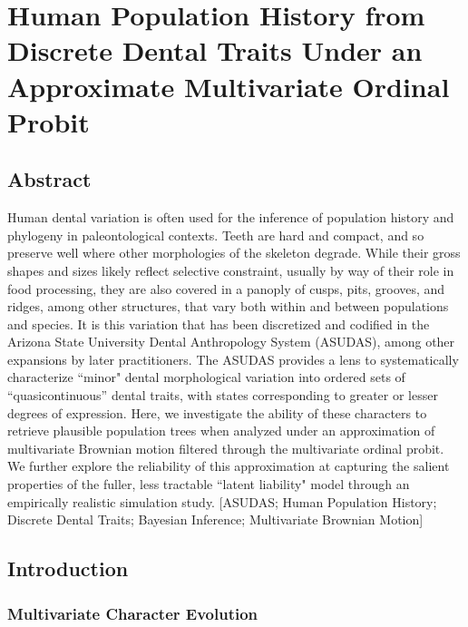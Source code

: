 \chapter[Human Population History from Discrete Dental Traits]{Human Population History from Discrete Dental Traits Under an \\Approximate Multivariate Ordinal Probit}

\label{chpt:Chapter4}


\clearpage

\section{Abstract}
 
Human dental variation is often used for the inference of population history and phylogeny in paleontological contexts. Teeth are hard and compact, and so preserve well where other morphologies of the skeleton degrade. While their gross shapes and sizes likely reflect selective constraint, usually by way of their role in food processing, they are also covered in a panoply of cusps, pits, grooves, and ridges, among other structures, that vary both within and between populations and species. It is this variation that has been discretized and codified in the Arizona State University Dental Anthropology System (ASUDAS), among other expansions by later practitioners. The ASUDAS provides a lens to systematically characterize ``minor" dental morphological variation into ordered sets of ``quasicontinuous'' dental traits, with states corresponding to greater or lesser degrees of expression. Here, we investigate the ability of these characters to retrieve plausible population trees when analyzed under an approximation of multivariate Brownian motion filtered through the multivariate ordinal probit. We further explore the reliability of this approximation at capturing the salient properties of the fuller, less tractable ``latent liability" model through an empirically realistic simulation study. [ASUDAS; Human Population History; Discrete Dental Traits; Bayesian Inference; Multivariate Brownian Motion]
 
\clearpage

\section{Introduction}


\subsection{Multivariate Character Evolution}

